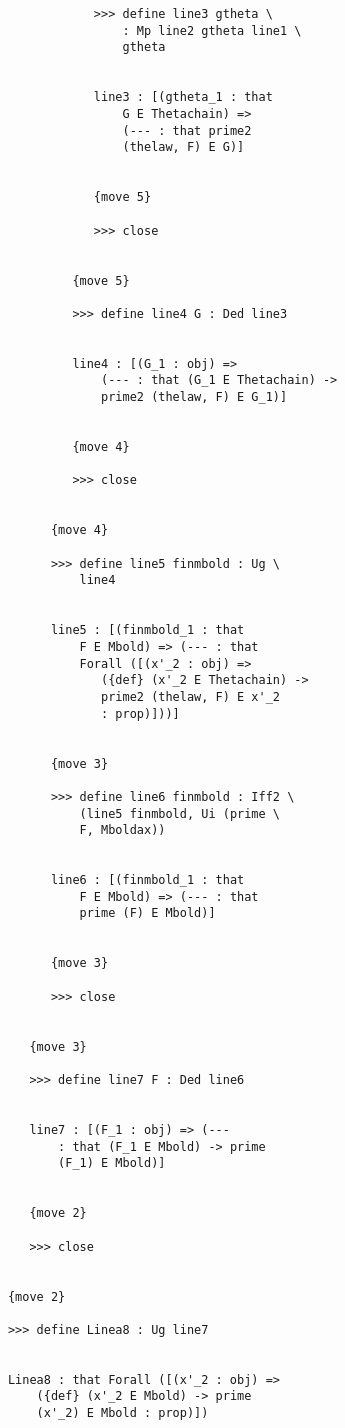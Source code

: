 \documentclass[12pt]{article}
\begin{document}
\begin{verbatim}
                  >>> define line3 gtheta \
                      : Mp line2 gtheta line1 \
                      gtheta


                  line3 : [(gtheta_1 : that 
                      G E Thetachain) => 
                      (--- : that prime2 
                      (thelaw, F) E G)]


                  {move 5}

                  >>> close


               {move 5}

               >>> define line4 G : Ded line3


               line4 : [(G_1 : obj) => 
                   (--- : that (G_1 E Thetachain) -> 
                   prime2 (thelaw, F) E G_1)]


               {move 4}

               >>> close


            {move 4}

            >>> define line5 finmbold : Ug \
                line4


            line5 : [(finmbold_1 : that 
                F E Mbold) => (--- : that 
                Forall ([(x'_2 : obj) => 
                   ({def} (x'_2 E Thetachain) -> 
                   prime2 (thelaw, F) E x'_2 
                   : prop)]))]


            {move 3}

            >>> define line6 finmbold : Iff2 \
                (line5 finmbold, Ui (prime \
                F, Mboldax))


            line6 : [(finmbold_1 : that 
                F E Mbold) => (--- : that 
                prime (F) E Mbold)]


            {move 3}

            >>> close


         {move 3}

         >>> define line7 F : Ded line6


         line7 : [(F_1 : obj) => (--- 
             : that (F_1 E Mbold) -> prime 
             (F_1) E Mbold)]


         {move 2}

         >>> close


      {move 2}

      >>> define Linea8 : Ug line7


      Linea8 : that Forall ([(x'_2 : obj) => 
          ({def} (x'_2 E Mbold) -> prime 
          (x'_2) E Mbold : prop)])



\end{verbatim}
\end{document}
